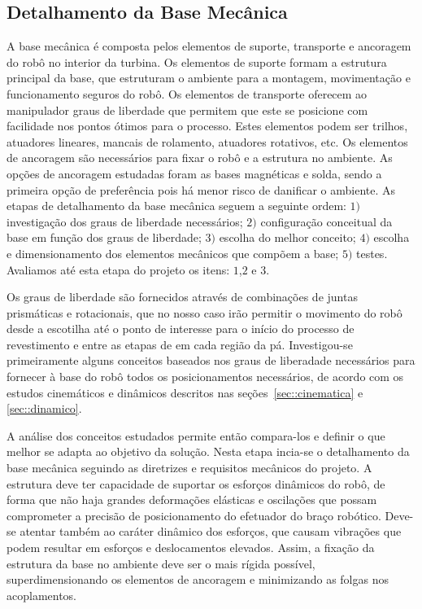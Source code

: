 \subsection{Detalhamento da Base Mecânica}\label{sec::base_mec}
A base mecânica é composta pelos elementos de suporte, transporte e ancoragem do
robô no interior da turbina. Os elementos de suporte formam a estrutura
principal da base, que estruturam o ambiente para a montagem, movimentação e
funcionamento seguros do robô. Os elementos de transporte oferecem ao
manipulador graus de liberdade que permitem que este se posicione com facilidade
nos pontos ótimos para o processo. Estes elementos podem ser trilhos, atuadores
lineares, mancais de rolamento, atuadores rotativos, etc. Os elementos de
ancoragem são necessários para fixar o robô e a estrutura no ambiente. As
opções de ancoragem estudadas foram as bases magnéticas e solda, sendo a
primeira opção de preferência pois há menor risco de danificar o ambiente. As
etapas de detalhamento da base mecânica seguem a seguinte ordem: $1)$ investigação dos
graus de liberdade necessários; $2)$ configuração conceitual da base em função
dos graus de liberdade; $3)$ escolha do melhor conceito; $4)$ escolha e
dimensionamento dos elementos mecânicos que compõem a base; $5)$ testes.
Avaliamos até esta etapa do projeto os itens: $1$,$2$ e $3$.

Os graus de liberdade são fornecidos através de combinações de juntas
prismáticas e rotacionais, que no nosso caso irão permitir o movimento do robô
desde a escotilha até o ponto de interesse para o início do processo de
revestimento e entre as etapas de em cada região da pá.
Investigou-se primeiramente alguns conceitos baseados nos graus de liberadade 
necessários para fornecer à base do robô todos os posicionamentos necessários, 
de acordo com os estudos cinemáticos e dinâmicos descritos  nas
seções~\ref{sec::cinematica} e \ref{sec::dinamico}.

A análise dos conceitos estudados permite então compara-los e definir o que
melhor se adapta ao objetivo da solução. Nesta etapa incia-se o detalhamento da base
mecânica seguindo as diretrizes e requisitos mecânicos do projeto. A
estrutura deve ter capacidade de suportar os esforços dinâmicos do robô,
de forma que não haja grandes deformações elásticas e oscilações que possam
comprometer a precisão de posicionamento do efetuador do braço robótico.
Deve-se atentar também ao caráter dinâmico dos esforços, que causam vibrações
que podem resultar em esforços e deslocamentos elevados.
Assim, a fixação da estrutura da base no ambiente deve ser o mais rígida
possível, superdimensionando os elementos de ancoragem e minimizando as folgas
nos acoplamentos.

